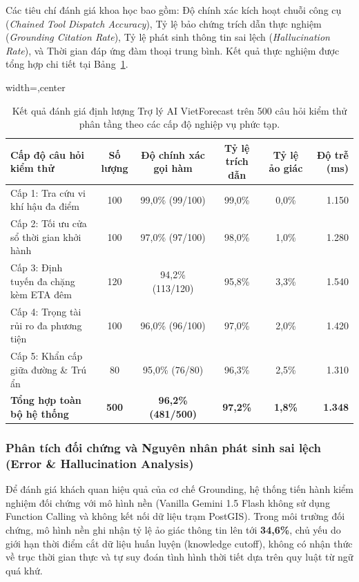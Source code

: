 Các tiêu chí đánh giá khoa học bao gồm: Độ chính xác kích hoạt chuỗi công cụ (\textit{Chained Tool Dispatch Accuracy}), Tỷ lệ bảo chứng trích dẫn thực nghiệm (\textit{Grounding Citation Rate}), Tỷ lệ phát sinh thông tin sai lệch (\textit{Hallucination Rate}), và Thời gian đáp ứng đàm thoại trung bình. Kết quả thực nghiệm được tổng hợp chi tiết tại Bảng~\ref{tab:ai_grounding_eval_vi}.

\begin{table}[htbp]
\centering
\caption[Đánh giá định lượng Trợ lý AI theo các cấp độ câu hỏi phức tạp]{Kết quả đánh giá định lượng Trợ lý AI VietForecast trên 500 câu hỏi kiểm thử phân tầng theo các cấp độ nghiệp vụ phức tạp.}
\label{tab:ai_grounding_eval_vi}
\begin{adjustbox}{width=\textwidth,center}
\begin{tabular}{p{5.2cm}ccccr}
\toprule
\textbf{Cấp độ câu hỏi kiểm thử} & \textbf{Số lượng} & \textbf{Độ chính xác gọi hàm} & \textbf{Tỷ lệ trích dẫn} & \textbf{Tỷ lệ ảo giác} & \textbf{Độ trễ (ms)} \\
\midrule
Cấp 1: Tra cứu vi khí hậu đa điểm & 100 & 99,0\% (99/100) & 99,0\% & 0,0\% & 1.150 \\
Cấp 2: Tối ưu cửa sổ thời gian khởi hành & 100 & 97,0\% (97/100) & 98,0\% & 1,0\% & 1.280 \\
Cấp 3: Định tuyến đa chặng kèm ETA đêm & 120 & 94,2\% (113/120) & 95,8\% & 3,3\% & 1.540 \\
Cấp 4: Trọng tài rủi ro đa phương tiện & 100 & 96,0\% (96/100) & 97,0\% & 2,0\% & 1.420 \\
Cấp 5: Khẩn cấp giữa đường \& Trú ẩn & 80 & 95,0\% (76/80) & 96,3\% & 2,5\% & 1.310 \\
\midrule
\textbf{Tổng hợp toàn bộ hệ thống} & \textbf{500} & \textbf{96,2\% (481/500)} & \textbf{97,2\%} & \textbf{1,8\%} & \textbf{1.348} \\
\bottomrule
\end{tabular}
\end{adjustbox}
\end{table}

\subsubsection{Phân tích đối chứng và Nguyên nhân phát sinh sai lệch (Error \& Hallucination Analysis)}
Để đánh giá khách quan hiệu quả của cơ chế Grounding, hệ thống tiến hành kiểm nghiệm đối chứng với mô hình nền (Vanilla Gemini 1.5 Flash không sử dụng Function Calling và không kết nối dữ liệu trạm PostGIS). Trong môi trường đối chứng, mô hình nền ghi nhận tỷ lệ ảo giác thông tin lên tới \textbf{34,6\%}, chủ yếu do giới hạn thời điểm cắt dữ liệu huấn luyện (knowledge cutoff), không có nhận thức về trục thời gian thực và tự suy đoán tình hình thời tiết dựa trên quy luật từ ngữ quá khứ. 

